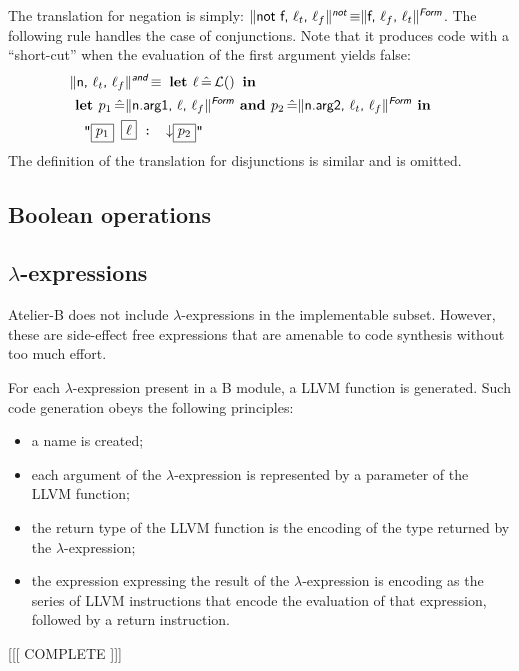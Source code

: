 \documentclass{article}
\newcommand{\trad}[2]{\ensuremath{\lVert \textsf{#1} \rVert^{\textit{#2}}}}
\newcommand{\nl}[0]{\ensuremath{\downarrow}}
\DeclareMathOperator{\isdef}{\equiv}
\DeclareMathOperator{\lbl}{\mathcal{L}()}
\newcommand{\llvm}[1]{\texttt{#1}}
\newcommand{\B}[1]{\textsf{#1}}
\newcommand{\LET}[0]{\textbf{ let }}
\DeclareMathOperator{\BE}{\hat{=}}
\newcommand{\IN}[0]{\textbf{ in }}
\newcommand{\AND}[0]{\textbf{ and }}
\newcommand{\PH}[1]{\framebox{$#1$}}
\begin{document}
\noindent The translation for negation is simply: $\trad{not f, $\ell_t$,
  $\ell_f$}{\B{not}} \isdef \trad{f, $\ell_f$, $\ell_t$}{\B{Form}}$.  The
following rule handles the case of conjunctions. Note that it produces code with
a ``short-cut'' when the evaluation of the first argument yields false:
\begin{align*}
\begin{split}
  \lefteqn{\trad{n, $\ell_t$, $\ell_f$}{\B{and}} \isdef \LET \ell \BE \lbl \IN} \\
  & \LET p_1 \BE \trad{n.arg1, $\ell$, $\ell_f$}{\B{Form}}
  \AND p_2 \BE \trad{n.arg2, $\ell_t$, $\ell_f$}{\B{Form}} \IN \\
  & \quad \llvm{"\PH{p_1} \PH{\ell} :  \nl \PH{p_2}"}
\end{split}
\end{align*}
The definition of the translation for disjunctions is similar and is omitted.

\subsection{Boolean operations}

\subsection{$\lambda$-expressions}

Atelier-B does not include $\lambda$-expressions in the implementable
subset.  However, these are side-effect free expressions that are
amenable to code synthesis without too much effort.

For each $\lambda$-expression present in a B module, a LLVM function
is generated. Such code generation obeys the following principles:
\begin{itemize}
\item a name is created;
\item each argument of the $\lambda$-expression is represented by
  a parameter of the LLVM function;
\item the return type of the LLVM function is the encoding of the type
  returned by the $\lambda$-expression;
\item the expression expressing the result of the $\lambda$-expression
  is encoding as the series of LLVM instructions that encode the evaluation
  of that expression, followed by a return instruction.
\end{itemize}


[[[ COMPLETE ]]]
\end{document}
